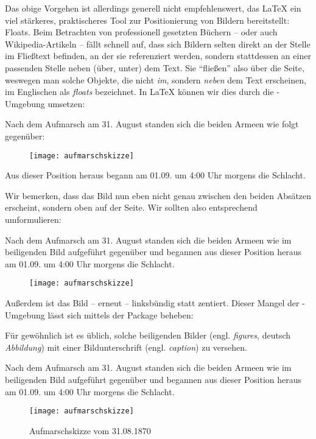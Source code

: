 Das obige Vorgehen ist allerdings generell nicht empfehlenswert, das \LaTeX{} ein viel stärkeres, praktischeres Tool zur Positionierung von Bildern bereitstellt: Floats.
Beim Betrachten von professionell gesetzten Büchern -- oder auch Wikipedia-Artikeln -- fällt schnell auf, dass sich Bildern selten direkt an der Stelle im Fließtext befinden, an der sie referenziert werden, sondern stattdessen an einer passenden Stelle neben (über, unter) dem Text.
Sie \enquote{fließen} also über die Seite, weswegen man solche Objekte, die nicht \emph{im}, sondern \emph{neben} dem Text erscheinen, im Englischen als \emph{floats} bezeichnet.
In \LaTeX{} können wir dies durch die -Umgebung umsetzen:
\begin{latexlisting}
	Nach dem Aufmarsch am 31. August standen sich die beiden Armeen wie folgt gegenüber:

	\begin{figure}
		\texttt{[image: aufmarschskizze]}		
	\end{figure}

	Aus dieser Position heraus begann am 01.09. um 4:00 Uhr morgens die Schlacht.
\end{latexlisting}
Wir bemerken, dass das Bild nun eben nicht genau zwischen den beiden Absätzen erscheint, sondern oben auf der Seite.
Wir sollten also entsprechend umformulieren:
\begin{latexlisting}
	Nach dem Aufmarsch am 31. August standen sich die beiden Armeen wie im beiligenden Bild aufgeführt gegenüber und begannen aus dieser Position heraus am 01.09. um 4:00 Uhr morgens die Schlacht.

	\begin{figure}
		\texttt{[image: aufmarschskizze]}		
	\end{figure}
\end{latexlisting}
Außerdem ist das Bild -- erneut -- linksbündig statt zentiert.
Dieser Mangel der -Umgebung lässt sich mittels der Package  beheben:
\begin{latexlisting}
	\usepackage{floatrow}
\end{latexlisting}
Für gewöhnlich ist es üblich, solche beiligenden Bilder (engl. \emph{figures}, deutsch \emph{Abbildung}) mit einer Bildunterschrift (engl. \emph{caption}) zu versehen.
\begin{latexlisting}
	Nach dem Aufmarsch am 31. August standen sich die beiden Armeen wie im beiligenden Bild aufgeführt gegenüber und begannen aus dieser Position heraus am 01.09. um 4:00 Uhr morgens die Schlacht.

	\begin{figure}
		\texttt{[image: aufmarschskizze]}		
		\caption{Aufmarschskizze vom 31.08.1870}
	\end{figure}
\end{latexlisting}
